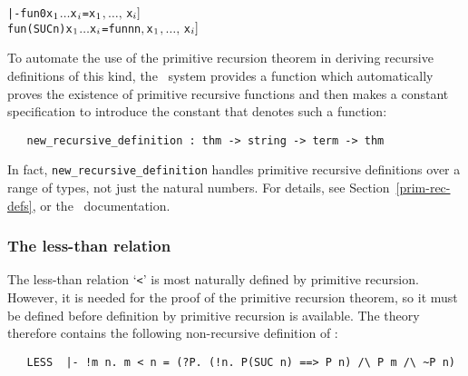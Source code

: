 {\begin{hol}\begin{alltt}
   |- fun 0 x\(\sb{1}\) \(\dots\) x\(\sb{i}\) = \m{f\sb{1}[}x\(\sb{1}\)\(,\ldots,\,\)x\(\sb{i}]\)
      fun (SUC n) x\(\sb{1}\) \(\dots\) x\(\sb{i}\) = \m{f\sb{2}[}fun n  n\(,\) x\(\sb{1}\)\(,\ldots,\,\)x\(\sb{i}]\)
\end{alltt}\end{hol}

To automate the use of the primitive recursion theorem in deriving
recursive definitions of this kind, the \HOL\ system provides a function
which automatically proves the existence of primitive recursive
functions and then makes a constant specification to introduce the constant
that denotes such a function:

\begin{boxed}
\begin{verbatim}
   new_recursive_definition : thm -> string -> term -> thm
\end{verbatim}\end{boxed}

\noindent In fact, {\small\verb+new_recursive_definition+} handles
primitive recursive definitions over a range of types, not just the
natural numbers. For details, see
Section~\ref{prim-rec-defs}, or the \REFERENCE\ documentation.

\subsubsection{The less-than relation}

The less-than relation `{\small{\tt\verb+<+}}' is most naturally defined by
  primitive recursion. However, it is needed for the proof of the
  primitive recursion theorem, so it must be defined before definition
  by primitive recursion is available. The theory 
  therefore contains the following non-recursive definition of \ml{<}:

\begin{hol}
\begin{verbatim}
   LESS  |- !m n. m < n = (?P. (!n. P(SUC n) ==> P n) /\ P m /\ ~P n)
\end{verbatim}\end{hol}

}
